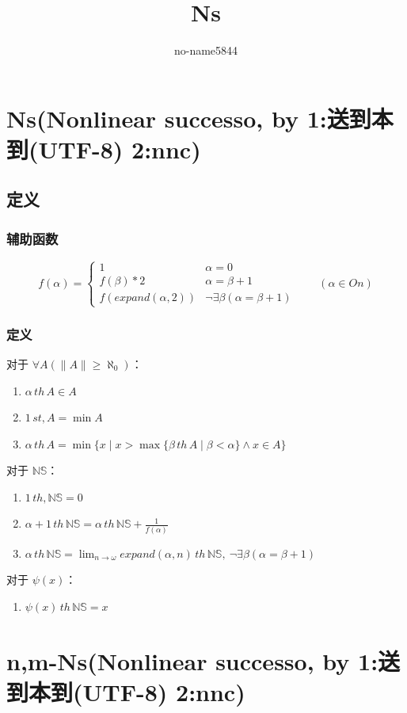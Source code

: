 \documentclass[UTF8]{ctexart}
\title{Ns}
\author{no-name5844}
\begin{document}
\maketitle

\section{Ns(Nonlinear successo, by 1:送到本到(UTF-8) 2:nnc)}
\subsection{定义}
\subsubsection{辅助函数}
\[
f(\alpha)=\begin{cases}
  1 & \alpha=0\\
  f(\beta)*2 & \alpha=\beta+1\\
  f(expand(\alpha,2)) & \lnot\exists\beta(\alpha=\beta+1)
\end{cases}\qquad(\alpha\in On)
\]

\subsubsection{定义}
对于 $\forall A(\|A\|\ge\aleph_0)$：
\begin{enumerate}
  \item $\alpha\,th\,A\in A$
  \item $1\,st,A=\min A$
  \item $\alpha\,th\,A=\min\{x\mid x>\max\{\beta\,th\,A\mid\beta<\alpha\}\land x\in A\}$
\end{enumerate}
对于 $\mathbb{NS}$：
\begin{enumerate}
  \item $1\,th,\mathbb{NS}=0$
  \item $\alpha+1\,th\,\mathbb{NS}=\alpha\,th\,\mathbb{NS}+\frac{1}{f(\alpha)}$
  \item $\alpha\,th\,\mathbb{NS}=\lim_{n\to\omega}expand(\alpha,n)\,th\,\mathbb{NS},\ \lnot\exists\beta(\alpha=\beta+1)$
\end{enumerate}
对于 $\psi(x)$：
\begin{enumerate}
  \item $\psi(x)\,th\,\mathbb{NS}=x$
\end{enumerate}

\section{n,m-Ns(Nonlinear successo, by 1:送到本到(UTF-8) 2:nnc)}
\end{document}
